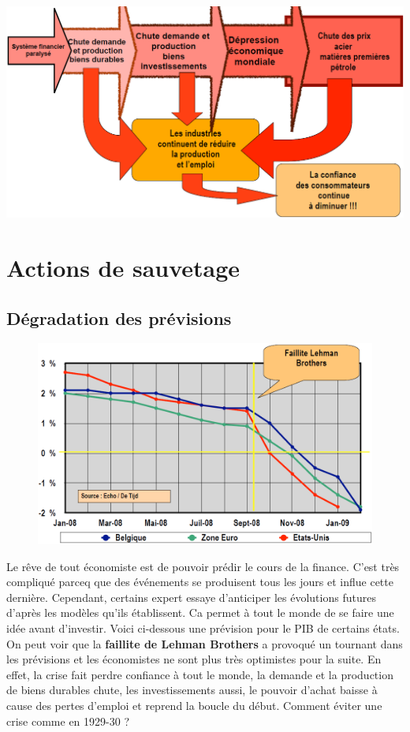 \begin{center}
	\includegraphics[scale=0.4]{22}
\end{center}

\section{Actions de sauvetage}
\subsection{Dégradation des prévisions}
\begin{figure}
	\includegraphics[scale=0.35]{23}
\end{figure}
Le rêve de tout économiste est de pouvoir prédir le cours de la finance. C'est très compliqué parceq que des événements se produisent tous les jours et influe cette dernière. Cependant, certains expert essaye d'anticiper les évolutions futures d'après les modèles qu'ils établissent. Ca permet à tout le monde de se faire une idée avant d'investir. Voici ci-dessous une prévision pour le PIB de certains états. On peut voir que la \textbf{faillite de Lehman Brothers} a provoqué un tournant dans les prévisions et les économistes ne sont plus très optimistes pour la suite. En effet, la crise fait perdre confiance à tout le monde, la demande et la production de biens durables chute, les investissements aussi, le pouvoir d'achat baisse à cause des pertes d'emploi et reprend la boucle du début. Comment éviter une crise comme en 1929-30 ?


